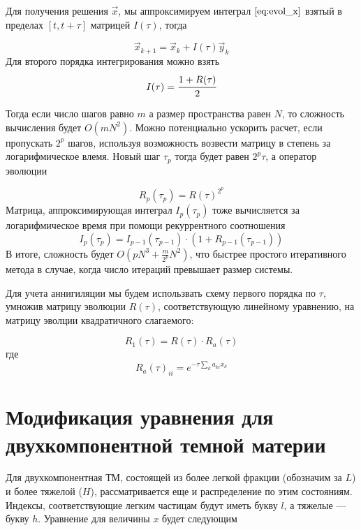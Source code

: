 Для получения решения $\vec{x}$, мы аппроксимируем интеграл $\ref{eq:evol_x}$ взятый в пределах $[t,t+\tau]$ матрицей $I(\tau)$, тогда

\begin{equation}
	\label{eq:solver_x}
	\vec{x}_{k+1} = \vec{x}_{k} + I(\tau) \vec{y}_k
\end{equation}
Для второго порядка интегрирования можно взять
\begin{equation}
	\label{eq:I_tau}
	I(\tau) = \cfrac{1+R(\tau)}{2}
\end{equation}

Тогда если число шагов равно $m$ а размер пространства равен $N$, то сложность вычисления будет $O(mN^2)$.
Можно потенциально ускорить расчет, если пропускать $2^p$ шагов, используя возможность возвести матрицу в степень за логарифмическое влемя. Новый шаг $\tau_p$ тогда будет равен $2^p \tau$, а оператор эволюции 

\begin{equation}
	R_p(\tau_p) = R(\tau)^{2^p}
\end{equation}
Матрица, аппроксимирующая интеграл $I_p(\tau_p)$ тоже вычисляется за логарифмическое время при помощи рекуррентного соотношения
\begin{equation}
	I_p(\tau_p) = I_{p-1}(\tau_{p-1})\cdot (1 + R_{p-1}(\tau_{p-1}))
\end{equation}
В итоге, сложность будет $O(p N^3 + \frac{m}{2^p}N^2)$, что быстрее простого итеративного метода в случае, когда число итераций превышает размер системы.

Для учета аннигиляции мы будем использвать схему первого порядка по $\tau$, умножив матрицу эволюции $R(\tau)$, соответствующую линейному уравнению, на матрицу эволции квадратичного слагаемого:

\begin{equation}
	R_1(\tau) = R(\tau)\cdot R_a(\tau)
\end{equation}
где
\begin{equation}
	R_a(\tau)_{ii} = e^{-\tau\sum_k{a_{ki}x_k}}
\end{equation}

\section{Модификация уравнения для двухкомпонентной темной материи}

Для двухкомпонентная ТМ, состоящей из более легкой фракции (обозначим за $L$) и более тяжелой ($H$), рассматривается еще и распределение по этим состояниям. Индексы, соответствующие легким частицам будут иметь букву $l$, а тяжелые --- букву $h$. Уравнение для величины $x$ будет следующим

